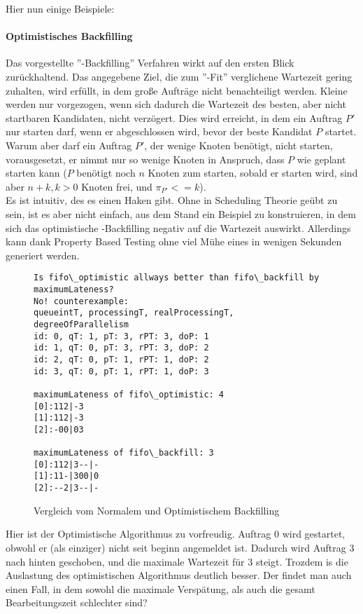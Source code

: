 Hier nun einige Beispiele:\\

\paragraph{Optimistisches Backfilling}
\label{optfill}
Das vorgestellte ''-Backfilling'' Verfahren wirkt auf den ersten Blick zurückhaltend. Das angegebene Ziel, die zum ''-Fit'' verglichene Wartezeit gering zuhalten, wird erfüllt, in dem große Aufträge nicht benachteiligt werden. Kleine werden nur vorgezogen, wenn sich dadurch die Wartezeit des besten, aber nicht startbaren Kandidaten, nicht verzögert. Dies wird erreicht, in dem ein Auftrag $P'$ nur starten darf, wenn er abgeschlossen wird, bevor der beste Kandidat $P$ startet.\\
Warum aber darf ein Auftrag $P'$, der wenige Knoten benötigt, nicht starten, vorausgesetzt, er nimmt nur so wenige Knoten in Anspruch, dass $P$ wie geplant starten kann ($P$ benötigt noch $n$ Knoten zum starten, sobald er starten wird, sind aber $n+k, k>0$ Knoten frei, und $\pi_{P'} <= k$).\\
Es ist intuitiv, des es einen Haken gibt. Ohne in Scheduling Theorie geübt zu sein, ist es aber nicht einfach, aus dem Stand ein Beispiel zu konstruieren, in dem sich das optimistische -Backfilling negativ auf die Wartezeit auswirkt. Allerdings kann dank Property Based Testing ohne viel Mühe eines in wenigen Sekunden generiert werden.

\begin{figure}
\centering
\begin{verbatim}
Is fifo\_optimistic allways better than fifo\_backfill by maximumLateness?
No! counterexample:
queueintT, processingT, realProcessingT, degreeOfParallelism
id: 0, qT: 1, pT: 3, rPT: 3, doP: 1
id: 1, qT: 0, pT: 3, rPT: 3, doP: 2
id: 2, qT: 0, pT: 1, rPT: 1, doP: 2
id: 3, qT: 0, pT: 1, rPT: 1, doP: 3

maximumLateness of fifo\_optimistic: 4
[0]:112|-3
[1]:112|-3
[2]:-00|03

maximumLateness of fifo\_backfill: 3
[0]:112|3--|-
[1]:11-|300|0
[2]:--2|3--|-
\end{verbatim}
\caption{Vergleich vom Normalem und Optimistischem Backfilling}
\label{onlateness}
\end{figure}

\FloatBarrier

Hier ist der Optimistische Algorithmus zu vorfreudig. Auftrag 0 wird gestartet, obwohl er (als einziger) nicht seit beginn angemeldet ist. Dadurch wird Auftrag 3 nach hinten geschoben, und die maximale Wartezeit für 3 steigt. Trozdem is die Auslastung des optimistischen Algorithmus deutlich besser. Der findet man auch einen Fall, in dem sowohl die maximale Verspätung, als auch die gesamt Bearbeitungszeit schlechter sind?\\


